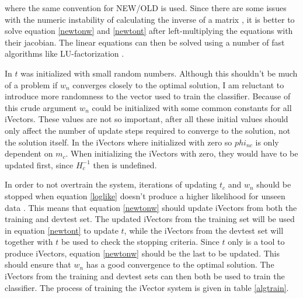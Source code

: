where the same convention for NEW/OLD is used. Since there are some issues with the numeric instability of calculating the inverse of a matrix \cite[section 28.4]{cormen}, it is better to solve equation \ref{newtonw} and \ref{newtont} after left-multiplying the equations with their jacobian. The linear equations can then be solved using a number of fast algorithms like LU-factorization \cite[section 20.2]{kreyszig}.

In \cite{liiVector} $t$ was initialized with small random numbers. Although this shouldn't be much of a problem if $w_n$ converges closely to the optimal solution, I am reluctant to introduce more randomness to the vector used to train the classifier. Because of this crude argument $w_n$ could be initialized with some common constants for all iVectors. These values are not so important, after all these initial values should only affect the number of update steps required to converge to the solution, not the solution itself. In \cite{sviVector} the iVectors where initialized with zero so $phi_{nc}$ is only dependent on $m_c$. When initializing the iVectors with zero, they would have to be updated first, since $H_c^{-1}$ then is undefined.

In order to not overtrain the system, iterations of updating $t_c$ and $w_n$ should be stopped when equation \ref{loglike} doesn't produce a higher likelihood for unseen data \cite{liiVector}. This means that equation \ref{newtonw} should update iVectors from both the training and devtest set. The updated iVectors from the training set will be used in equation \ref{newtont} to update $t$, while the iVectors from the devtest set will together with $t$ be used to check the stopping criteria. Since $t$ only is a tool to produce iVectors, equation \ref{newtonw} should be the last to be updated. This should ensure that $w_n$ has a good convergence to the optimal solution. The iVectors from the training and devtest sets can then both be used to train the classifier. The process of training the iVector system is given in table \ref{algtrain}.

